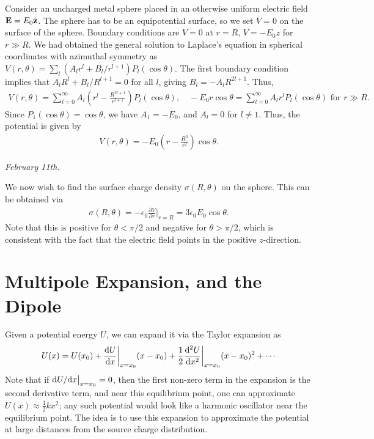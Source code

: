 Consider an uncharged metal sphere placed in an otherwise uniform electric field $\mathbf{E} = E_{0} \hat{\mathbf{z}}$. The sphere has to be an equipotential surface, so we set $V = 0$ on the surface of the sphere. Boundary conditions are $V = 0$ at $r = R$, $V = -E_{0} z$ for $r \gg R$. We had obtained the general solution to Laplace's equation in spherical coordinates with azimuthal symmetry as $V(r,\theta) = \sum_{l} (A_{l} r^{l} + B_{l}/r^{l+1}) P_{l}(\cos \theta)$. The first boundary condition implies that $A_{l} R^{l} + B_{l}/R^{l+1} = 0$ for all $l$, giving $B_{l} = - A_{l} R^{2l+1}$. Thus,
\begin{align}
    V(r,\theta) = \sum_{l=0}^{\infty} A_{l} \left( r^{l} - \frac{R^{2l+1}}{r^{l+1}} \right) P_{l}(\cos \theta), \quad -E_{0} r \cos \theta = \sum_{l=0}^{\infty} A_{l} r^{l} P_{l}(\cos \theta) \text{ for } r \gg R.
\end{align}
Since $P_{1}(\cos \theta) = \cos \theta$, we have $A_{1} = -E_{0}$, and $A_{l} = 0$ for $l \neq 1$. Thus, the potential is given by
\begin{align}
    V(r,\theta) = -E_{0} \left( r - \frac{R^{3}}{r^{2}} \right) \cos \theta.
\end{align}


\noindent \textit{February 11th.}

We now wish to find the surface charge density $\sigma(R,\theta)$ on the sphere. This can be obtained via
\begin{align}
    \sigma(R,\theta) = -\epsilon_{0} \frac{\partial V}{\partial r} \bigg|_{r=R} = 3 \epsilon_{0} E_{0} \cos \theta.
\end{align}
Note that this is positive for $\theta < \pi/2$ and negative for $\theta > \pi/2$, which is consistent with the fact that the electric field points in the positive $z$-direction.

\section{Multipole Expansion, and the Dipole}

Given a potential energy $U$, we can expand it via the Taylor expansion as
\begin{align}
    U(x) = U(x_{0}) + \frac{\mathrm{d}U}{\mathrm{d}x} \bigg|_{x=x_{0}} (x-x_{0}) + \frac{1}{2} \frac{\mathrm{d}^{2} U}{\mathrm{d}x^{2}} \bigg|_{x=x_{0}} (x-x_{0})^{2} + \cdots
\end{align}
Note that if $\mathrm{d}U/\mathrm{d}x \big|_{x=x_{0}} = 0$, then the first non-zero term in the expansion is the second derivative term, and near this equilibrium point, one can approximate $U(x) \approx \frac{1}{2} k x^{2}$; any such potential would look like a harmonic oscillator near the equilibrium point. The idea is to use this expansion to approximate the potential at large distances from the source charge distribution. 

